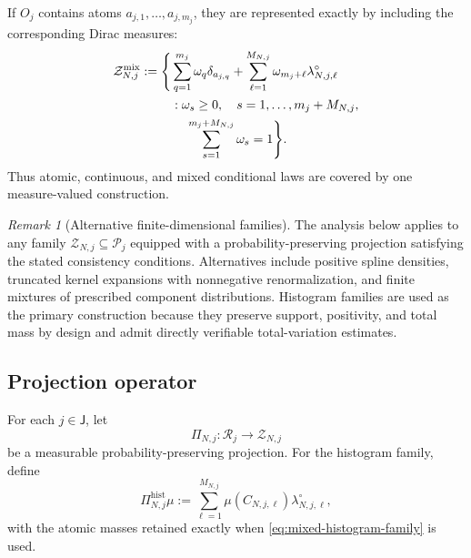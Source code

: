 \documentclass[10pt,twocolumn]{article}
\theoremstyle{remark}
\newtheorem{remark}{Remark}
\newcommand{\Pcal}{\mathcal{P}}
\begin{document}
If \(O_j\) contains atoms \(a_{j,1},\ldots,a_{j,m_j}\), they are represented exactly by including the corresponding Dirac measures:
\begin{equation}
	\begin{aligned}
		\mathcal Z_{N,j}^{\mathrm{mix}}
		:=
		\Bigg\{
		&\sum_{q=1}^{m_j}
		\omega_q\delta_{a_{j,q}}
		+
		\sum_{\ell=1}^{M_{N,j}}
		\omega_{m_j+\ell}
		\lambda_{N,j,\ell}^{\circ}
		\\
		&:
		\omega_s\geq0,\quad
		s=1,\ldots,m_j+M_{N,j},
		\\
		&\hspace{1.2em}
		\sum_{s=1}^{m_j+M_{N,j}}\omega_s=1
		\Bigg\}.
	\end{aligned}
	\label{eq:mixed-histogram-family}
\end{equation}
Thus atomic, continuous, and mixed conditional laws are covered by one measure-valued construction.

\begin{remark}[Alternative finite-dimensional families]
	\label{rem:alternative-approximation-families}
	The analysis below applies to any family \(\mathcal Z_{N,j}\subseteq\Pcal_j\) equipped with a probability-preserving projection satisfying the stated consistency conditions. Alternatives include positive spline densities, truncated kernel expansions with nonnegative renormalization, and finite mixtures of prescribed component distributions. Histogram families are used as the primary construction because they preserve support, positivity, and total mass by design and admit directly verifiable total-variation estimates.
\end{remark}

\subsection{Projection operator}
\label{subsec:projection-operator}

For each \(j\in\mathsf J\), let
\begin{equation*}
	\Pi_{N,j}:\mathcal R_j\longrightarrow\mathcal Z_{N,j}
	\label{eq:classwise-projection}
\end{equation*}
be a measurable probability-preserving projection. For the histogram family, define
\begin{equation}
	\Pi_{N,j}^{\mathrm{hist}}\mu
	:=
	\sum_{\ell=1}^{M_{N,j}}
	\mu(C_{N,j,\ell})\lambda_{N,j,\ell}^{\circ},
	\label{eq:histogram-projection}
\end{equation}
with the atomic masses retained exactly when \cref{eq:mixed-histogram-family} is used.
\end{document}

